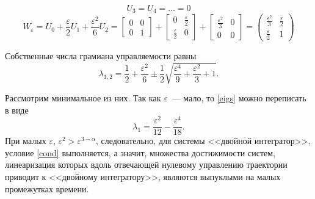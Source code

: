 \documentclass[../main.tex]{subfiles}
\begin{document}
 \begin{equation*}
	 U_3 = U_4 = \dots = 0
 \end{equation*}
 \begin{equation*}
	 W_{\varepsilon} = U_0 + \dfrac{\varepsilon}{2} U_1 + \dfrac{\varepsilon^2}{6} U_2 = \left[ {\begin{array}{*{20}{c}}
			 0&0\\
			 0&1
	 \end{array}}\right] + \left[ {\begin{array}{*{20}{c}}
			 0&\frac{\varepsilon}{2}\\
			 \frac{\varepsilon}{2}&0
	 \end{array}}\right] +\left[ {\begin{array}{*{20}{c}}
			 \frac{\varepsilon^2}{3}&0\\
			 0&0
	 \end{array}}\right] =  
	 \begin{pmatrix}
		 \frac{\varepsilon^2}{3}&\frac{\varepsilon}{2}\\
		 \frac{\varepsilon}{2}&1
	 \end{pmatrix} 
 \end{equation*}
 
 Собственные числа грамиана управляемости равны
 \begin{equation}\label{eigs}
	 \lambda_{1,2} = \dfrac{1}{2}+\dfrac{\varepsilon^2}{6} \pm \dfrac{1}{2}\sqrt{\dfrac{\varepsilon^4}{9} + \dfrac{\varepsilon^2}{3} +1}.
 \end{equation}
 
 Рассмотрим минимальное из них. Так как $ \varepsilon $~--- мало, то \eqref{eigs} можно переписать в виде
 \begin{equation*}
	 \lambda_1 = \dfrac{\varepsilon^2}{12} - \dfrac{\varepsilon^4}{18}.
 \end{equation*} 
 При малых $ \varepsilon  $, $ \varepsilon^2 >  \varepsilon^{3-\alpha}  $, следовательно,  для системы <<двойной интегратор>>, условие \eqref{cond} выполняется, а значит, множества достижимости систем, линеаризация которых вдоль отвечающей нулевому управлению траектории приводит к <<двойному интегратору>>, являются выпуклыми на малых промежутках времени.
\end{document}
